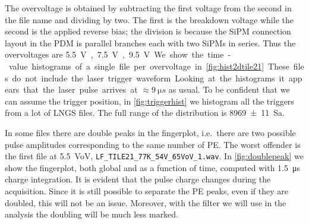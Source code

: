 The overvoltage is obtained by subtracting the first voltage from the second in
the file name and dividing by two. The first is the breakdown voltage while the
second is the applied reverse bias; the division is because the SiPM connection
layout in the PDM is parallel branches each with two SiPMs in series. Thus the
overvoltages are \SI{5.5}V, \SI{7.5}V, \SI{9.5}V.

We show the time-value histograms of a single file per overvoltage in
\autoref{fig:hist2dtile21}. These files do not include the laser trigger
waveform. Looking at the histograms it appears that the laser pulse arrives at
$\approx\SI{9}{\micro s}$ as usual. To be confident that we can assume the
trigger position, in \autoref{fig:triggerhist} we histogram all the triggers
from a lot of LNGS files. The full range of the distribution is
\SI[separate-uncertainty=true]{8969 \pm 11}{Sa}.

\begin{figure}
    
    
    
\end{figure}

In some files there are double peaks in the fingerplot, i.e.~there are two
possible pulse amplitudes corresponding to the same number of PE. The worst
offender is the first file at \SI{5.5}{VoV},
\nolinkurl{LF_TILE21_77K_54V_65VoV_1.wav}. In \autoref{fig:doublepeak} we show
the fingerplot, both global and as a function of time, computed with
\SI{1.5}{\micro s} charge integration. It is evident that the pulse charge
changes during the acquisition. Since it is still possible to separate the PE
peaks, even if they are doubled, this will not be an issue. Moreover, with the
filter we will use in the analysis the doubling will be much less marked.

\begin{figure}
    
    
    
\end{figure}

